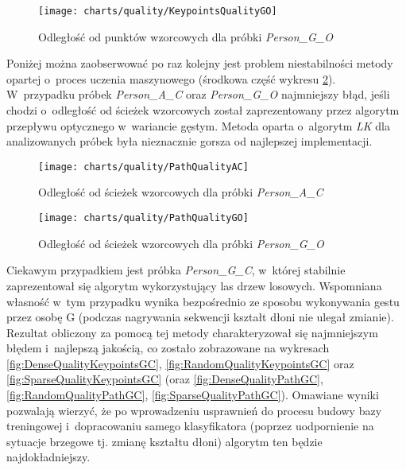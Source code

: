       \begin{figure}[!ht]
        \centering
        \texttt{[image: charts/quality/KeypointsQualityGO]}
        \caption[Odległość od punktów wzorcowych (próbka osoby G, gest O)]
                {Odległość od punktów wzorcowych dla próbki \textit{Person\_G\_O}}
        \label{fig:KeypointsQualityGO}
      \end{figure}

    Poniżej można zaobserwować po raz kolejny jest problem niestabilności metody opartej o~proces uczenia maszynowego (środkowa część wykresu \ref{fig:PathQualityAC}). W~przypadku próbek \textit{Person\_A\_C} oraz \textit{Person\_G\_O} najmniejszy błąd, jeśli chodzi o~odległość od ścieżek wzorcowych został zaprezentowany przez algorytm przepływu optycznego w~wariancie gęstym. Metoda oparta o~algorytm \textit{LK} dla analizowanych próbek była nieznacznie gorsza od najlepszej implementacji.

    \newpage
      \begin{figure}[!ht]
        \centering
        \texttt{[image: charts/quality/PathQualityAC]}
        \caption[Odległość od ścieżek wzorcowych (próbka osoby A, gest C)]
                {Odległość od ścieżek wzorcowych dla próbki \textit{Person\_A\_C}}
        \label{fig:PathQualityAC}
      \end{figure}

      \begin{figure}[!ht]
        \centering
        \texttt{[image: charts/quality/PathQualityGO]}
        \caption[Odległość od ścieżek wzorcowych (próbka osoby G, gest O)]
                {Odległość od ścieżek wzorcowych dla próbki \textit{Person\_G\_O}}
        \label{fig:PathQualityGO}
      \end{figure}

    Ciekawym przypadkiem jest próbka \textit{Person\_G\_C}, w~której stabilnie zaprezentował się algorytm wykorzystujący las drzew losowych. Wspomniana własność w~tym przypadku wynika bezpośrednio ze sposobu wykonywania gestu przez osobę G (podczas nagrywania sekwencji kształt dłoni nie ulegał zmianie). Rezultat obliczony za pomocą tej metody charakteryzował się najmniejszym błędem i~najlepszą jakością, co zostało zobrazowane na wykresach \ref{fig:DenseQualityKeypointsGC}, \ref{fig:RandomQualityKeypointsGC} oraz \ref{fig:SparseQualityKeypointsGC} (oraz \ref{fig:DenseQualityPathGC}, \ref{fig:RandomQualityPathGC}, \ref{fig:SparseQualityPathGC}). Omawiane wyniki pozwalają wierzyć, że po wprowadzeniu usprawnień do procesu budowy bazy treningowej i~dopracowaniu samego klasyfikatora (poprzez uodpornienie na sytuacje brzegowe tj. zmianę kształtu dłoni) algorytm ten będzie najdokładniejszy.

